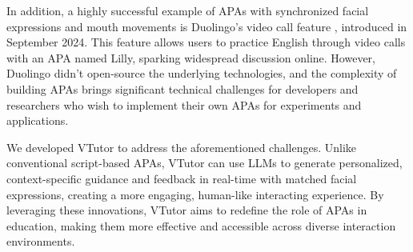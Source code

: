 In addition, a highly successful example of APAs with synchronized facial expressions and mouth movements is Duolingo’s video call feature \cite{duolingoVideoCall}, introduced in September 2024. This feature allows users to practice English through video calls with an APA named Lilly, sparking widespread discussion online. However, Duolingo didn't open-source the underlying technologies, and the complexity of building APAs brings significant technical challenges for developers and researchers who wish to implement their own APAs for experiments and applications.

We developed VTutor to address the aforementioned challenges. Unlike conventional script-based APAs, VTutor can use LLMs to generate personalized, context-specific guidance and feedback in real-time with matched facial expressions, creating a more engaging, human-like interacting experience. By leveraging these innovations, VTutor aims to redefine the role of APAs in education, making them more effective and accessible across diverse interaction environments.